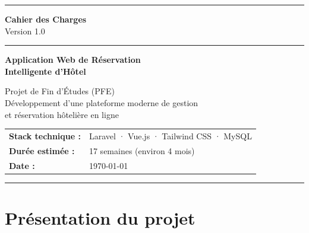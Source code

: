 \documentclass[12pt,a4paper]{report}
\begin{document}
\begin{titlepage}
  \centering
  \vspace*{1cm}

  {\color{hotelblue}\rule{\linewidth}{2pt}}
  \vspace{0.5cm}

  {\Huge\bfseries\color{hotelblue} Cahier des Charges}\\[0.4cm]
  {\large\color{gray} Version 1.0}\\[0.8cm]

  {\color{hotelblue}\rule{\linewidth}{1pt}}
  \vspace{1cm}

  {\LARGE\bfseries Application Web de Réservation\\[0.3cm] Intelligente d'Hôtel}\\[1.5cm]

  \begin{tcolorbox}[colback=hotelblue!10, colframe=hotelblue, width=0.8\linewidth]
    \centering
    \large
    Projet de Fin d'Études (PFE)\\[0.3cm]
    \normalsize
    Développement d'une plateforme moderne de gestion\\
    et réservation hôtelière en ligne
  \end{tcolorbox}

  \vfill

  \begin{tabular}{ll}
    \textbf{Stack technique :} & Laravel · Vue.js · Tailwind CSS · MySQL \\[4pt]
    \textbf{Durée estimée :}   & 17 semaines (environ 4 mois)              \\[4pt]
    \textbf{Date :}            & \today                                    \\
  \end{tabular}

  \vspace{1cm}
  {\color{hotelblue}\rule{\linewidth}{2pt}}
\end{titlepage}

\tableofcontents
\newpage

\chapter{Présentation du projet}
\end{document}
